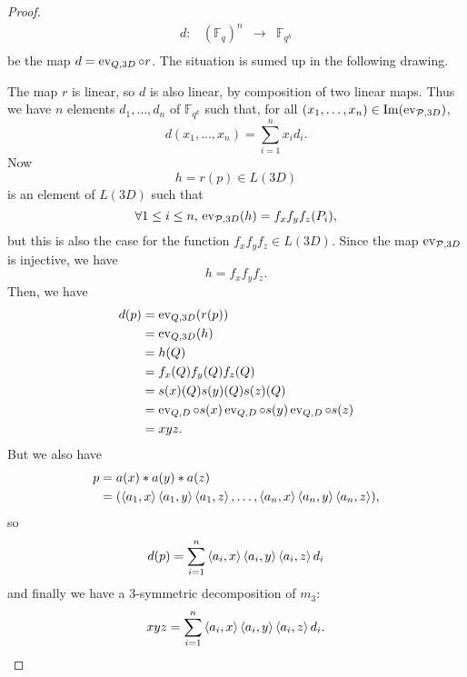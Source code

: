 \documentclass[11pt]{article}
\begin{document}
\begin{proof}
\[\begin{array}{cccc}
          d: & (\mathbb{F}_{q})^n & \to & \mathbb{F}_{q^k} \\
\end{array}
  \]
  be the map $d = \operatorname{ev}_{Q, 3D}\circ r$.   The situation is sumed up in the
  following drawing.
  \begin{center}
\end{center}
The map $r$ is linear, so $d$ is also linear, by
  composition of two linear maps. Thus we have $n$ elements $d_1, \dots, d_n$ of
  $\mathbb{F}_{q^k}$ such that, for all $(x_1, \dots, x_n)\in\operatorname{Im}(\operatorname{ev}_{\mathcal{P},
  3D})$,
  \[
    d(x_1, \dots, x_n) = \sum_{i=1}^n x_i d_i.
  \]
Now
\[
  h = r(p)\in L(3D)
\]
is an element of $L(3D)$ such that
\[
  \forall 1\leq i\leq n,\,\operatorname{ev}_{\mathcal{P}, 3D}(h) = f_xf_yf_z(P_i),
\]
but this is also the case for the function $f_xf_yf_z\in L(3D)$. Since the map
$\operatorname{ev}_{\mathcal{P}, 3D}$ is injective, we have
\[
  h = f_xf_yf_z.
\]
Then, we have
\begin{equation*}
  \begin{split}
  d(p) &= \operatorname{ev}_{Q, 3D}(r(p))\\
  &= \operatorname{ev}_{Q, 3D}(h)\\
  &= h(Q)\\
  &= f_x(Q)f_y(Q)f_z(Q)\\
  &= s(x)(Q)s(y)(Q)s(z)(Q)\\
  &= \operatorname{ev}_{Q, D}\circ s(x)\operatorname{ev}_{Q, D}\circ s(y)\operatorname{ev}_{Q, D}\circ s(z)\\
  &= xyz.
  \end{split}
\end{equation*}
But we also have
\begin{equation*}
  \begin{split}
    p &= a(x)*a(y)*a(z)\\
    &= (\left\langle a_1,x\right\rangle\left\langle a_1,y\right\rangle\left\langle a_1,z\right\rangle, \dots,
    \left\langle a_n,x\right\rangle\left\langle a_n,y\right\rangle\left\langle a_n,z\right\rangle),
  \end{split}
\end{equation*}
so
\[
  d(p) = \sum_{i=1}^n\left\langle a_i,x\right\rangle\left\langle a_i,y\right\rangle\left\langle a_i,z\right\rangle d_i
\]
and finally we have a $3$-symmetric decomposition of $m_3$:
\[
  xyz = \sum_{i=1}^n\left\langle a_i,x\right\rangle\left\langle a_i,y\right\rangle\left\langle a_i,z\right\rangle d_i.
\]
\end{proof}
\end{document}
